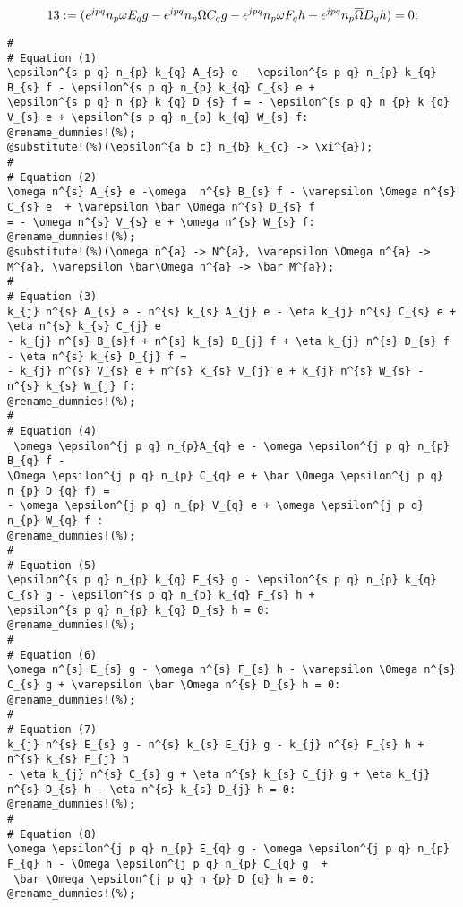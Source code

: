 \documentclass[11pt]{article}
\def\specialcolon{\mathrel{\mathop{:}}\hspace{-.5em}}
\renewcommand{\bar}[1]{\overline{#1}}
\begin{document}
\begin{dmath*}[compact, spread=2pt]
13\specialcolon{}= ({\epsilon}^{j p q} {n}_{p} \omega {E}_{q} g - {\epsilon}^{j p q} {n}_{p} \Omega {C}_{q} g - {\epsilon}^{j p q} {n}_{p} \omega {F}_{q} h + {\epsilon}^{j p q} {n}_{p} \bar \Omega {D}_{q} h) = 0;
\end{dmath*}
{\color[named]{Blue}\begin{verbatim}
#
# Equation (1)
\epsilon^{s p q} n_{p} k_{q} A_{s} e - \epsilon^{s p q} n_{p} k_{q} B_{s} f - \epsilon^{s p q} n_{p} k_{q} C_{s} e +
\epsilon^{s p q} n_{p} k_{q} D_{s} f = - \epsilon^{s p q} n_{p} k_{q} V_{s} e + \epsilon^{s p q} n_{p} k_{q} W_{s} f:
@rename_dummies!(%);
@substitute!(%)(\epsilon^{a b c} n_{b} k_{c} -> \xi^{a});
#
# Equation (2)
\omega n^{s} A_{s} e -\omega  n^{s} B_{s} f - \varepsilon \Omega n^{s} C_{s} e  + \varepsilon \bar \Omega n^{s} D_{s} f
= - \omega n^{s} V_{s} e + \omega n^{s} W_{s} f:
@rename_dummies!(%);
@substitute!(%)(\omega n^{a} -> N^{a}, \varepsilon \Omega n^{a} -> M^{a}, \varepsilon \bar\Omega n^{a} -> \bar M^{a});
#
# Equation (3)
k_{j} n^{s} A_{s} e - n^{s} k_{s} A_{j} e - \eta k_{j} n^{s} C_{s} e + \eta n^{s} k_{s} C_{j} e
- k_{j} n^{s} B_{s}f + n^{s} k_{s} B_{j} f + \eta k_{j} n^{s} D_{s} f - \eta n^{s} k_{s} D_{j} f =
- k_{j} n^{s} V_{s} e + n^{s} k_{s} V_{j} e + k_{j} n^{s} W_{s} - n^{s} k_{s} W_{j} f:
@rename_dummies!(%);
#
# Equation (4)
 \omega \epsilon^{j p q} n_{p}A_{q} e - \omega \epsilon^{j p q} n_{p} B_{q} f -
\Omega \epsilon^{j p q} n_{p} C_{q} e + \bar \Omega \epsilon^{j p q} n_{p} D_{q} f) =
- \omega \epsilon^{j p q} n_{p} V_{q} e + \omega \epsilon^{j p q} n_{p} W_{q} f :
@rename_dummies!(%);
#
# Equation (5)
\epsilon^{s p q} n_{p} k_{q} E_{s} g - \epsilon^{s p q} n_{p} k_{q} C_{s} g - \epsilon^{s p q} n_{p} k_{q} F_{s} h +
\epsilon^{s p q} n_{p} k_{q} D_{s} h = 0:
@rename_dummies!(%);
#
# Equation (6)
\omega n^{s} E_{s} g - \omega n^{s} F_{s} h - \varepsilon \Omega n^{s} C_{s} g + \varepsilon \bar \Omega n^{s} D_{s} h = 0:
@rename_dummies!(%);
#
# Equation (7)
k_{j} n^{s} E_{s} g - n^{s} k_{s} E_{j} g - k_{j} n^{s} F_{s} h + n^{s} k_{s} F_{j} h
- \eta k_{j} n^{s} C_{s} g + \eta n^{s} k_{s} C_{j} g + \eta k_{j} n^{s} D_{s} h - \eta n^{s} k_{s} D_{j} h = 0:
@rename_dummies!(%);
#
# Equation (8)
\omega \epsilon^{j p q} n_{p} E_{q} g - \omega \epsilon^{j p q} n_{p} F_{q} h - \Omega \epsilon^{j p q} n_{p} C_{q} g  +
 \bar \Omega \epsilon^{j p q} n_{p} D_{q} h = 0:
@rename_dummies!(%);
\end{verbatim}}
\end{document}
